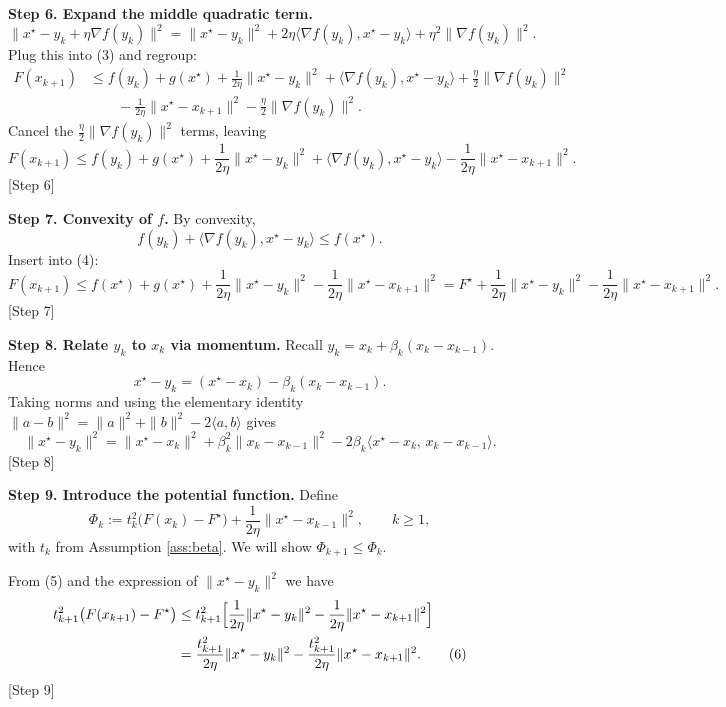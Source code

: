 \documentclass{article}
\begin{document}
\noindent\textbf{Step 6.  Expand the middle quadratic term.}
\[
\|x^\star-y_k+\eta\nabla f(y_k)\|^{2}
= \|x^\star-y_k\|^{2}+2\eta\langle\nabla f(y_k),x^\star-y_k\rangle+\eta^{2}\|\nabla f(y_k)\|^{2}.
\]
Plug this into (3) and regroup:
\[
\begin{aligned}
F(x_{k+1}) &\le f(y_k)+g(x^\star)+\frac{1}{2\eta}\|x^\star-y_k\|^{2}
            +\langle\nabla f(y_k),x^\star-y_k\rangle
            +\frac{\eta}{2}\|\nabla f(y_k)\|^{2}\\
&\qquad -\frac{1}{2\eta}\|x^\star-x_{k+1}\|^{2}
            -\frac{\eta}{2}\|\nabla f(y_k)\|^{2}.
\end{aligned}
\] 
Cancel the $\frac{\eta}{2}\|\nabla f(y_k)\|^{2}$ terms, leaving
\[
F(x_{k+1}) \le f(y_k)+g(x^\star)+\frac{1}{2\eta}\|x^\star-y_k\|^{2}
            +\langle\nabla f(y_k),x^\star-y_k\rangle
            -\frac{1}{2\eta}\|x^\star-x_{k+1}\|^{2}. \tag{4}
\] 
[Step 6]

\noindent\textbf{Step 7.  Convexity of $f$.}  
By convexity,
\[
f(y_k) + \langle\nabla f(y_k),x^\star-y_k\rangle \le f(x^\star).
\] 
Insert into (4):
\[
F(x_{k+1}) \le f(x^\star)+g(x^\star)+\frac{1}{2\eta}\|x^\star-y_k\|^{2}
            -\frac{1}{2\eta}\|x^\star-x_{k+1}\|^{2}
            = F^\star +\frac{1}{2\eta}\|x^\star-y_k\|^{2}
            -\frac{1}{2\eta}\|x^\star-x_{k+1}\|^{2}. \tag{5}
\] 
[Step 7]

\noindent\textbf{Step 8.  Relate $y_k$ to $x_k$ via momentum.}  
Recall $y_k = x_k + \beta_k (x_k-x_{k-1})$. Hence
\[
x^\star - y_k = (x^\star - x_k) - \beta_k (x_k-x_{k-1}).
\]
Taking norms and using the elementary identity
$\|a-b\|^{2}= \|a\|^{2}+\|b\|^{2}-2\langle a,b\rangle$ gives
\[
\|x^\star-y_k\|^{2}= \|x^\star-x_k\|^{2}
                  +\beta_k^{2}\|x_k-x_{k-1}\|^{2}
                  -2\beta_k\langle x^\star-x_k,\,x_k-x_{k-1}\rangle .
\] 
[Step 8]

\noindent\textbf{Step 9.  Introduce the potential function.}  
Define
\[
\Phi_k := t_k^{2}\bigl(F(x_k)-F^\star\bigr)+\frac{1}{2\eta}\|x^\star-x_{k-1}\|^{2},
\qquad k\ge 1,
\]
with $t_k$ from Assumption \ref{ass:beta}.  
We will show $\Phi_{k+1}\le \Phi_k$.

From (5) and the expression of $\|x^\star-y_k\|^{2}$ we have
\[
\begin{aligned}
t_{k+1}^{2}\bigl(F(x_{k+1})-F^\star\bigr) 
&\le t_{k+1}^{2}\Bigl[\frac{1}{2\eta}\|x^\star-y_k\|^{2}
                     -\frac{1}{2\eta}\|x^\star-x_{k+1}\|^{2}\Bigr] \\
&= \frac{t_{k+1}^{2}}{2\eta}\|x^\star-y_k\|^{2}
   -\frac{t_{k+1}^{2}}{2\eta}\|x^\star-x_{k+1}\|^{2}. \tag{6}
\end{aligned}
\] 
[Step 9]
\end{document}
